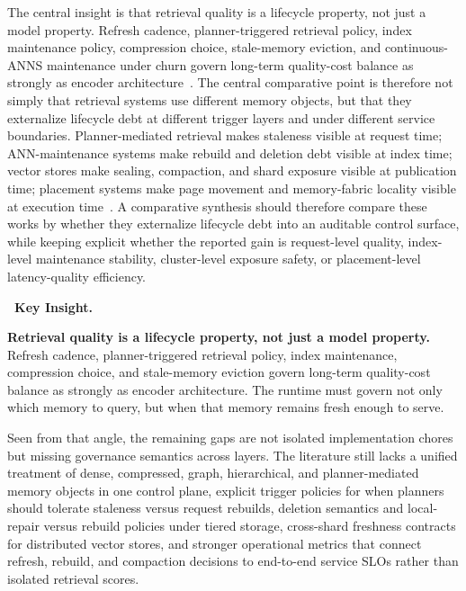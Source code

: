 \documentclass[acmsmall,screen,review]{acmart}
\newenvironment{keybox}{%
  \vspace{6pt}\noindent
  \begin{lrbox}{\keyboxcontent}
  \begin{minipage}{\dimexpr\linewidth-2\fboxsep-2\fboxrule\relax}
  \raggedright
  \textbf{\faLightbulbO\ \textcolor{keyborder}{Key Insight.}}\par\smallskip
}{%
  \end{minipage}
  \end{lrbox}
  \fcolorbox{keyborder}{keybg}{\usebox{\keyboxcontent}}%
  \vspace{6pt}%
}
\begin{document}
The central insight is that retrieval quality is a lifecycle property, not just a model property. Refresh cadence, planner-triggered retrieval policy, index maintenance policy, compression choice, stale-memory eviction, and continuous-ANNS maintenance under churn govern long-term quality-cost balance as strongly as encoder architecture~\cite{asai2024selfrag,wang2026candor,zhang2026flowrag}. The central comparative point is therefore not simply that retrieval systems use different memory objects, but that they externalize lifecycle debt at different trigger layers and under different service boundaries. Planner-mediated retrieval makes staleness visible at request time; ANN-maintenance systems make rebuild and deletion debt visible at index time; vector stores make sealing, compaction, and shard exposure visible at publication time; placement systems make page movement and memory-fabric locality visible at execution time~\cite{asai2024selfrag,singh2021freshdiskann,xu2023spfresh,xu2025place,wang2021milvus,guo2022manu,zhang2024rummy,quinn2025accelerating,zhang2026flowrag,wang2026candor}. A comparative synthesis should therefore compare these works by whether they externalize lifecycle debt into an auditable control surface, while keeping explicit whether the reported gain is request-level quality, index-level maintenance stability, cluster-level exposure safety, or placement-level latency-quality efficiency.


\begin{keybox}
\textbf{Retrieval quality is a lifecycle property, not just a model property.} Refresh cadence, planner-triggered retrieval policy, index maintenance, compression choice, and stale-memory eviction govern long-term quality-cost balance as strongly as encoder architecture. The runtime must govern not only which memory to query, but when that memory remains fresh enough to serve.
\end{keybox}
Seen from that angle, the remaining gaps are not isolated implementation chores but missing governance semantics across layers. The literature still lacks a unified treatment of dense, compressed, graph, hierarchical, and planner-mediated memory objects in one control plane, explicit trigger policies for when planners should tolerate staleness versus request rebuilds, deletion semantics and local-repair versus rebuild policies under tiered storage, cross-shard freshness contracts for distributed vector stores, and stronger operational metrics that connect refresh, rebuild, and compaction decisions to end-to-end service SLOs rather than isolated retrieval scores.
\end{document}
